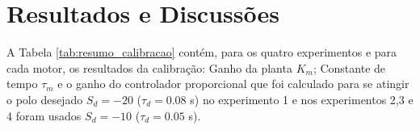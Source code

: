 \chapter[Resultados]{Resultados e Discussões}
\label{ch:resultados}






A Tabela \ref{tab:resumo_calibracao} contém, para os quatro experimentos e para cada motor, os resultados da calibração: Ganho da planta $K_m$; Constante de tempo $\tau_m$ e o ganho do controlador proporcional que foi calculado para se atingir o polo desejado $S_d = -20$ ($\tau_{d} = 0.08$ s) no experimento 1 e nos experimentos 2,3 e 4 foram usados $S_d = -10$ ($\tau_{d} = 0.05$ s).

